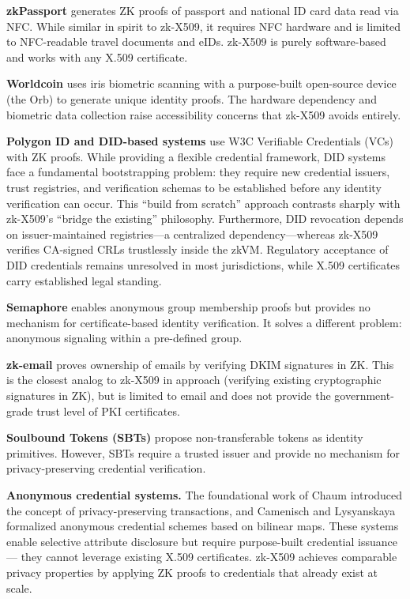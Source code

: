 \documentclass[11pt, a4paper]{article}
\begin{document}
\textbf{zkPassport} \cite{ref2} generates ZK proofs of passport and
national ID card data read via NFC. While similar in spirit to zk-X509,
it requires NFC hardware and is limited to NFC-readable travel documents
and eIDs. zk-X509 is purely software-based and works with any X.509
certificate.

\textbf{Worldcoin} \cite{ref3} uses iris biometric scanning with a
purpose-built open-source device (the Orb) to generate unique identity
proofs. The hardware dependency and biometric data collection raise
accessibility concerns that zk-X509 avoids entirely.

\textbf{Polygon ID and DID-based systems} \cite{ref13, ref33} use W3C Verifiable
Credentials (VCs) with ZK proofs. While providing a flexible credential
framework, DID systems face a fundamental bootstrapping problem: they
require new credential issuers, trust registries, and verification
schemas to be established before any identity verification can occur.
This ``build from scratch'' approach contrasts sharply with zk-X509's
``bridge the existing'' philosophy. Furthermore, DID revocation depends
on issuer-maintained registries---a centralized dependency---whereas
zk-X509 verifies CA-signed CRLs trustlessly inside the zkVM. Regulatory
acceptance of DID credentials remains unresolved in most jurisdictions,
while X.509 certificates carry established legal standing.

\textbf{Semaphore} \cite{ref8} enables anonymous group membership proofs but
provides no mechanism for certificate-based identity verification. It
solves a different problem: anonymous signaling within a pre-defined
group.

\textbf{zk-email} \cite{ref9} proves ownership of emails by verifying DKIM
signatures in ZK. This is the closest analog to zk-X509 in approach
(verifying existing cryptographic signatures in ZK), but is limited to
email and does not provide the government-grade trust level of PKI
certificates.

\textbf{Soulbound Tokens (SBTs)} \cite{ref10} propose non-transferable
tokens as identity primitives. However, SBTs require a trusted issuer
and provide no mechanism for privacy-preserving credential verification.

\textbf{Anonymous credential systems.} The foundational work of Chaum
\cite{ref19} introduced the concept of privacy-preserving transactions, and
Camenisch and Lysyanskaya \cite{ref18} formalized anonymous credential
schemes based on bilinear maps. These systems enable selective attribute
disclosure but require purpose-built credential issuance --- they cannot
leverage existing X.509 certificates. zk-X509 achieves comparable
privacy properties by applying ZK proofs to credentials that already
exist at scale.
\end{document}
